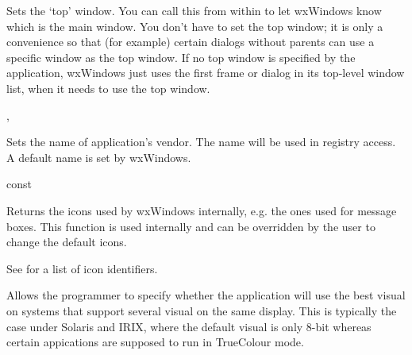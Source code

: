 \label{wxappsettopwindow}


Sets the `top' window. You can call this from within  to
let wxWindows know which is the main window. You don't have to set the top window;
it is only a convenience so that (for example) certain dialogs without parents can use a
specific window as the top window. If no top window is specified by the application,
wxWindows just uses the first frame or dialog in its top-level window list, when it
needs to use the top window.




, 


\label{wxappsetvendorname}


Sets the name of application's vendor. The name will be used
in registry access. A default name is set by
wxWindows.



\label{wxappgetstdicon}

 const

Returns the icons used by wxWindows internally, e.g. the ones used for 
message boxes.  This function is used internally and 
can be overridden by the user to change the default icons.



See  for a list of icon identifiers.

\label{wxappsetusebestvisual}


Allows the programmer to specify whether the application will use the best visual
on systems that support several visual on the same display. This is typically the
case under Solaris and IRIX, where the default visual is only 8-bit whereas certain
appications are supposed to run in TrueColour mode.

